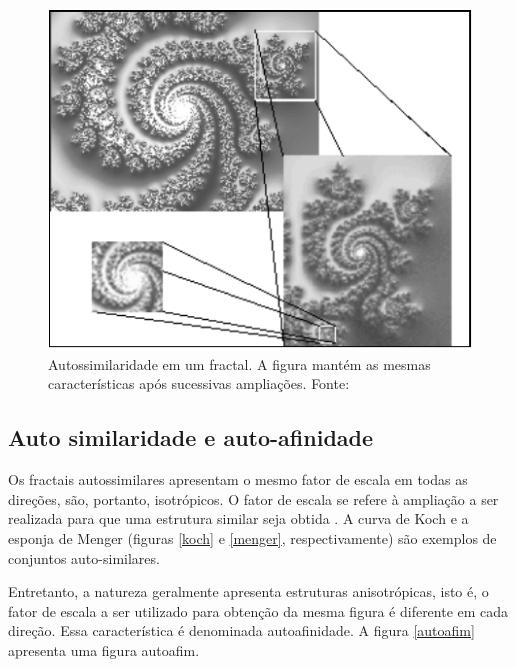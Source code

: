 \documentclass{ufscThesis}
\begin{document}
\begin{figure}[!h]
\centering
\includegraphics[scale=0.5]{autosimilar.png}
\caption{Autossimilaridade em um fractal. A figura mantém as mesmas características após sucessivas ampliações. Fonte: }
\label{autosimilar}
\end{figure}

\subsection{Auto similaridade e auto-afinidade}
Os fractais autossimilares apresentam o mesmo fator de escala em todas as direções, são, portanto, isotrópicos. O fator de escala se refere à ampliação a ser realizada para que uma estrutura similar seja obtida \cite{Figueiredo2013}. A curva de Koch e a esponja de Menger (figuras \ref{koch} e \ref{menger}, respectivamente) são exemplos de conjuntos auto-similares. \par
Entretanto, a natureza geralmente apresenta estruturas anisotrópicas, isto é, o fator de escala a ser utilizado para obtenção da mesma figura é diferente em cada direção. Essa característica é denominada autoafinidade. A figura \ref{autoafim} apresenta uma figura autoafim.\par
\end{document}

